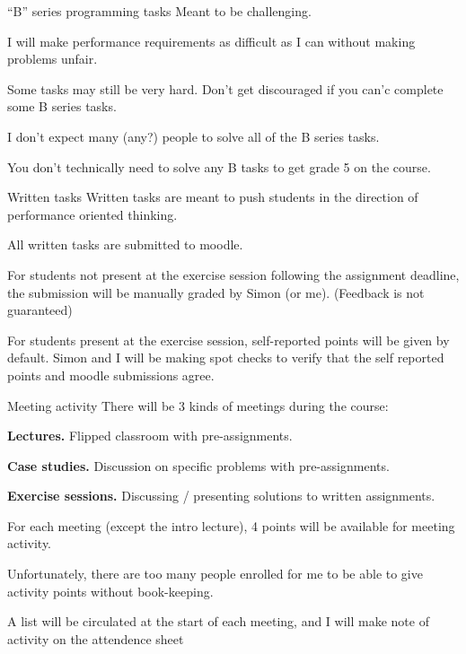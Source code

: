 \documentclass[11pt, aspectratio=169, table]{beamer}
\begin{document}
\begin{frame}{``B'' series programming tasks} 
\setlength\parskip{\fill}
Meant to be challenging.

I will make performance requirements as difficult as I can without making problems unfair.

Some tasks may still be very hard. Don't get discouraged if you can'c complete some B series tasks.

I don't expect many (any?) people to solve all of the B series tasks.

\alert{You don't technically need to solve any B tasks to get grade 5 on the course.}
\end{frame}

\begin{frame}{Written tasks}
\setlength\parskip{\fill}
Written tasks are meant to push students in the direction of performance oriented thinking.

All written tasks are submitted to moodle.

For students not present at the exercise session following the assignment deadline, the submission will be 
manually graded by Simon (or me). (Feedback is not guaranteed)

For students present at the exercise session, self-reported points will be given by default. Simon and I will be making 
spot checks to verify that the self reported points and moodle submissions agree.
\end{frame}


\begin{frame}{Meeting activity}
There will be 3 kinds of meetings during the course:
\begin{description}
	\item{{\bf Lectures.}} Flipped classroom with pre-assignments.
	\item{{\bf Case studies.}} Discussion on specific problems with pre-assignments.
	\item{{\bf Exercise sessions.}} Discussing / presenting solutions to written assignments.
\end{description}

For each meeting (except the intro lecture), 4 points will be available for meeting activity.

Unfortunately, there are too many people enrolled for me to be able to give activity points without book-keeping.

A list will be circulated at the start of each meeting, and I will make note of activity on the attendence sheet
\end{frame}
\end{document}
